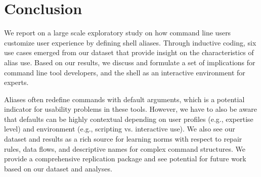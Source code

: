 \section{Conclusion}

We report on a large scale exploratory study on how command line users customize user experience by defining shell aliases.
Through inductive coding, six use cases emerged from our dataset that provide insight on the characteristics of alias use.
Based on our results, we discuss and formulate a set of implications for command line tool developers, and the shell as an interactive environment for experts.

Aliases often redefine commands with default arguments, which is a potential indicator for usability problems in these tools.
However, we have to also be aware that defaults can be highly contextual depending on user profiles (e.g., expertise level) and environment (e.g., scripting vs. interactive use).
We also see our dataset and results as a rich source for learning norms with respect to repair rules, data flows, and descriptive names for complex command structures.
We provide a comprehensive replication package and see potential for future work based on our dataset and analyses.